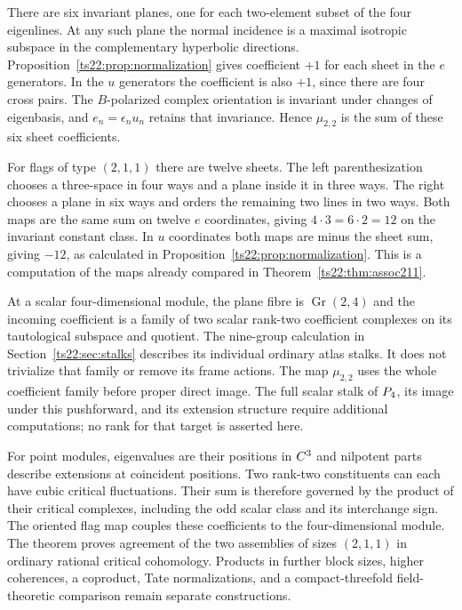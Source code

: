 There are six invariant planes, one for each two-element subset of
the four eigenlines. At any such plane the normal incidence is a
maximal isotropic subspace in the complementary hyperbolic directions.
Proposition~\ref{ts22:prop:normalization} gives coefficient $+1$
for each sheet in the $e$ generators. In the $u$ generators the
coefficient is also $+1$, since there are four cross pairs.
The $B$-polarized complex orientation is invariant under changes
of eigenbasis, and $e_n=\epsilon_nu_n$ retains that invariance.
Hence $\mu_{2,2}$ is the sum of these six sheet coefficients.

For flags of type $(2,1,1)$ there are twelve sheets. The left
parenthesization chooses a three-space in four ways and a plane
inside it in three ways. The right chooses a plane in six ways
and orders the remaining two lines in two ways. Both maps are the
same sum on twelve $e$ coordinates, giving $4\cdot3=6\cdot2=12$ on
the invariant constant class. In $u$ coordinates both maps are minus
the sheet sum, giving $-12$, as calculated in
Proposition~\ref{ts22:prop:normalization}. This is a computation of the maps
already compared in Theorem~\ref{ts22:thm:assoc211}.

At a scalar four-dimensional module, the plane fibre is
$\operatorname{Gr}(2,4)$ and the incoming coefficient is a family
of two scalar rank-two coefficient complexes on its tautological
subspace and quotient. The nine-group calculation in
Section~\ref{ts22:sec:stalks} describes its individual ordinary atlas
stalks. It does not trivialize that family or remove its frame
actions. The map $\mu_{2,2}$ uses the whole coefficient family
before proper direct image. The full scalar stalk of $P_4$, its
image under this pushforward, and its extension structure require
additional computations; no rank for that target is asserted here.

For point modules, eigenvalues are their positions in $C^3$ and
nilpotent parts describe extensions at coincident positions. Two
rank-two constituents can each have cubic critical fluctuations.
Their sum is therefore governed by the product of their critical
complexes, including the odd scalar class and its interchange sign.
The oriented flag map couples these coefficients to the four-dimensional
module. The theorem proves agreement of the two assemblies of
sizes $(2,1,1)$ in ordinary rational critical cohomology. Products
in further block sizes, higher coherences, a coproduct, Tate
normalizations, and a compact-threefold field-theoretic comparison
remain separate constructions.
